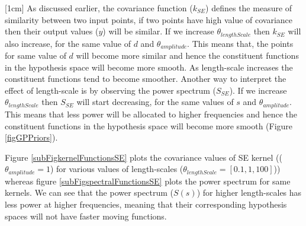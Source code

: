 
[1cm]
As discussed earlier, the covariance function ($k_{SE}$) defines the measure of similarity between two input points, if two points have high value of covariance then their output values ($y$) will be similar. If we increase $\theta_{lengthScale}$ then $k_{SE}$ will also increase, for the same value of $d$ and $\theta_{amplitude}$. This means that, the points for same value of $d$ will become more similar and hence the constituent functions in the hypothesis space will become more smooth. As length-scale increases the constituent functions tend to become smoother. Another way to interpret the effect of length-scale is by observing the power spectrum ($S_{SE}$). If we increase $\theta_{lengthScale}$ then $S_{SE}$ will start decreasing, for the same values of $s$ and $\theta_{amplitude}$. This means that less power will be allocated to higher frequencies and hence the constituent functions in the hypothesis space will become more smooth (Figure \ref{figGPPriors}). 

Figure \ref{subFigkernelFunctionsSE} plots the covariance values of SE kernel (($\theta_{amplitude} = 1$) for various values of length-scales ($\theta_{lengthScale} = [0.1, 1, 100]$)) whereas figure \ref{subFigspectralFunctionsSE} plots the power spectrum for same kernels. We can see that the power spectrum ($S(s)$) for higher length-scales has less power at higher frequencies, meaning that their corresponding hypothesis spaces will not have faster moving functions. 

